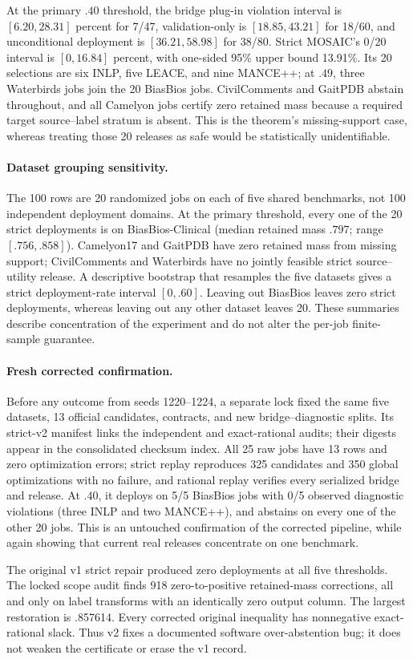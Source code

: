 At the primary $.40$ threshold, the bridge plug-in violation interval is
$[6.20,28.31]$ percent for 7/47, validation-only is $[18.85,43.21]$ for 18/60,
and unconditional deployment is $[36.21,58.98]$ for 38/80. Strict MOSAIC's
0/20 interval is $[0,16.84]$ percent, with one-sided 95\% upper bound 13.91\%.
Its 20 selections are six INLP, five LEACE, and nine MANCE++; at $.49$, three
Waterbirds jobs join the 20 BiasBios jobs. CivilComments and GaitPDB abstain
throughout, and all Camelyon jobs certify zero retained mass because a required
target source--label stratum is absent. This is the theorem's missing-support
case, whereas treating those 20 releases as safe would be statistically
unidentifiable.

\paragraph{Dataset grouping sensitivity.}
The 100 rows are 20 randomized jobs on each of five shared benchmarks, not 100
independent deployment domains. At the primary threshold, every one of the 20
strict deployments is on BiasBios-Clinical (median retained mass $.797$;
range $[.756,.858]$). Camelyon17 and GaitPDB have zero retained mass from
missing support; CivilComments and Waterbirds have no jointly feasible strict
source--utility release. A descriptive bootstrap that resamples the five
datasets gives a strict deployment-rate interval $[0,.60]$. Leaving out
BiasBios leaves zero strict deployments, whereas leaving out any other dataset
leaves 20. These summaries describe concentration of the experiment and do not
alter the per-job finite-sample guarantee.

\paragraph{Fresh corrected confirmation.}
Before any outcome from seeds 1220--1224, a separate lock fixed the same five
datasets, 13 official candidates, contracts, and new bridge--diagnostic splits.
Its strict-v2 manifest links the independent and exact-rational audits; their
digests appear in the consolidated checksum index. All 25 raw jobs have 13 rows and
zero optimization errors; strict replay reproduces 325 candidates and 350
global optimizations with no failure, and rational replay verifies every
serialized bridge and release. At $.40$, it deploys on 5/5 BiasBios jobs with
0/5 observed diagnostic violations (three INLP and two MANCE++), and abstains
on every one of the other 20 jobs. This is an untouched confirmation of the
corrected pipeline, while again showing that current real releases concentrate
on one benchmark.

The original v1 strict repair produced zero deployments at all five thresholds.
The locked scope audit finds 918 zero-to-positive retained-mass corrections,
all and only on label transforms with an identically zero output column. The
largest restoration is .857614. Every corrected original inequality has
nonnegative exact-rational slack. Thus v2 fixes a documented software
over-abstention bug; it does not weaken the certificate or erase the v1 record.
